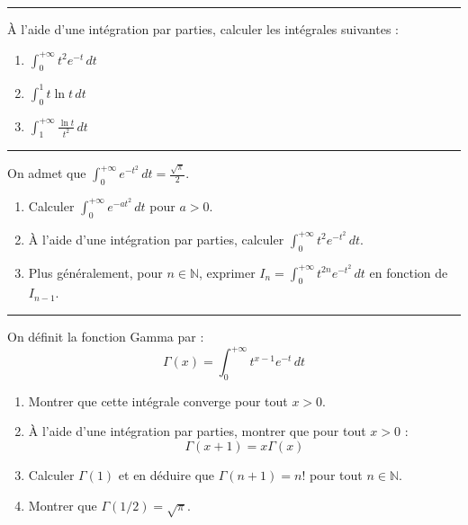 \documentclass[../PolyS4.tex]{subfiles}
\begin{document}
\vspace{1em}
\hrule
\vspace{1em}


À l'aide d'une intégration par parties, calculer les intégrales suivantes :

\begin{enumerate}
\item $\displaystyle\int_{0}^{+\infty} t^2 e^{-t} \, dt$
\item $\displaystyle\int_{0}^{1} t \ln t \, dt$
\item $\displaystyle\int_{1}^{+\infty} \frac{\ln t}{t^2} \, dt$
\end{enumerate}

\vspace{1em}
\hrule
\vspace{1em}


On admet que $\displaystyle\int_{0}^{+\infty} e^{-t^2} \, dt = \frac{\sqrt{\pi}}{2}$.

\begin{enumerate}
\item Calculer $\displaystyle\int_{0}^{+\infty} e^{-at^2} \, dt$ pour $a > 0$.
\item À l'aide d'une intégration par parties, calculer $\displaystyle\int_{0}^{+\infty} t^2 e^{-t^2} \, dt$.
\item Plus généralement, pour $n \in \mathbb{N}$, exprimer $I_n = \displaystyle\int_{0}^{+\infty} t^{2n} e^{-t^2} \, dt$ en fonction de $I_{n-1}$.
\end{enumerate}

\vspace{1em}
\hrule
\vspace{1em}

\newpage


On définit la fonction Gamma par :
$$\Gamma(x) = \int_{0}^{+\infty} t^{x-1} e^{-t} \, dt$$

\begin{enumerate}
\item Montrer que cette intégrale converge pour tout $x > 0$.
\item À l'aide d'une intégration par parties, montrer que pour tout $x > 0$ :
$$\Gamma(x+1) = x \Gamma(x)$$
\item Calculer $\Gamma(1)$ et en déduire que $\Gamma(n+1) = n!$ pour tout $n \in \mathbb{N}$.
\item Montrer que $\Gamma(1/2) = \sqrt{\pi}$.
\end{enumerate}
\end{document}
